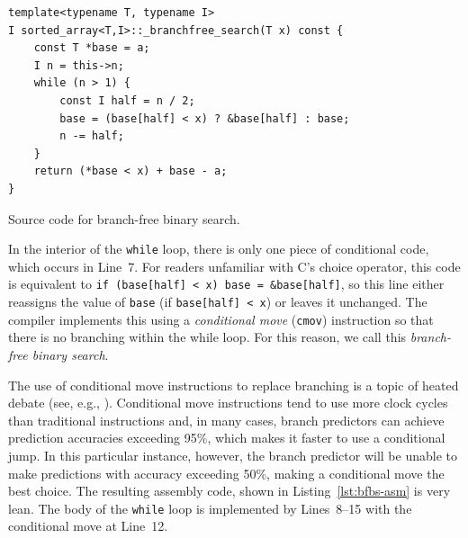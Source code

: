 \documentclass{patmorin}
\newcommand{\lstlabel}[1]{\label{lst:#1}}
\newcommand{\lstref}[1]{Listing~\ref{lst:#1}}
\begin{document}
\begin{listing}
\begin{verbatim}
template<typename T, typename I>
I sorted_array<T,I>::_branchfree_search(T x) const {
    const T *base = a;
    I n = this->n;
    while (n > 1) {
        const I half = n / 2;
        base = (base[half] < x) ? &base[half] : base;
        n -= half;
    }
    return (*base < x) + base - a;
}
\end{verbatim}
\caption{Source code for branch-free binary search.}
\lstlabel{bfbs}
\end{listing}

In the interior of the \texttt{while} loop, there is only one
piece of conditional code, which occurs in Line~7.  For readers unfamiliar
with C's choice operator, this code is equivalent to \texttt{if
(base[half] < x) base = &base[half]}, so this line either reassigns
the value of \texttt{base} (if \texttt{base[half]
< x}) or leaves it unchanged.  The compiler implements this using a
\emph{conditional move} (\texttt{cmov}) instruction so that
there is no branching within the while loop.  For this reason, we call
this \emph{branch-free binary search}.

The use of conditional move instructions to replace branching is a
topic of heated debate (see, e.g., \cite{torvalds:cmov}).  Conditional
move instructions tend to use more clock cycles than traditional
instructions and, in many cases, branch predictors can achieve prediction
accuracies exceeding 95\%, which makes it faster to use a conditional
jump.  In this particular instance, however, the branch predictor will
be unable to make predictions with accuracy exceeding 50\%, making a
conditional move the best choice.  The resulting assembly code, shown in
\lstref{bfbs-asm} is very lean.  The body of the \texttt{while}
loop is implemented by Lines~8--15 with the conditional move at Line~12.
\end{document}
